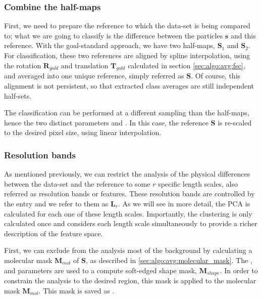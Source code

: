 \subsubsection{Combine the half-maps} \label{sec:algo:classification:combine_maps}

First, we need to prepare the reference to which the data-set is being compared to; what we are going to classify is the difference between the particles $\bm{s}$ and this reference. With the goal-standard approach, we have two half-maps, $\bm{S}_1$ and $\bm{S}_2$. For classification, these two references are aligned by spline interpolation, using the rotation $\bm{R}_{gold}$ and translation $\bm{T}_{gold}$ calculated in section \ref{sec:algo:avg:fsc}, and averaged into one unique reference, simply referred as $\bm{S}$. Of course, this alignment is not persistent, so that extracted class averages are still independent half-sets.

\begin{note}The classification can be performed at a different sampling than the half-maps, hence the two distinct parameters  and . In this case, the reference $\bm{S}$ is re-scaled to the desired pixel size, using linear interpolation.
\end{note}

\subsubsection{Resolution bands} \label{sec:algo:classification:resolution_bands}

As mentioned previously, we can restrict the analysis of the physical differences between the data-set and the reference to some $r$ specific length scales, also referred as resolution bands or features. These resolution bands are controlled by the  entry and we refer to them as $\bm{L}_r$. As we will see in more detail, the PCA is calculated for each one of these length scales. Importantly, the clustering is only calculated once and considers each length scale simultaneously to provide a richer description of the feature space.

First, we can exclude from the analysis most of the background by calculating a molecular mask $\bm{M}_{mol}$ of $\bm{S}$, as described in \ref{sec:algo:avg:molecular_mask}. The ,  and  parameters are used to a compute soft-edged shape mask, $\bm{M}_{shape}$. In order to constrain the analysis to the desired region, this mask is applied to the molecular mask $\bm{M}_{mol}$. This mask is saved as .

